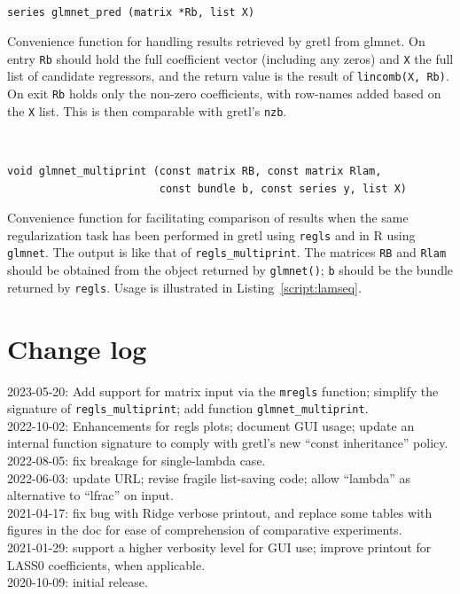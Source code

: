\documentclass{article}
\newenvironment{funcdoc}
{\noindent\hrulefill\\[-12pt]}
{\medbreak}
\begin{document}
\begin{funcdoc}
\begin{verbatim}
series glmnet_pred (matrix *Rb, list X)
\end{verbatim}
  Convenience function for handling results retrieved by gretl from
  \textsf{glmnet}. On entry \texttt{Rb} should hold the full
  coefficient vector (including any zeros) and \texttt{X} the full
  list of candidate regressors, and the return value is the result of
  \texttt{lincomb(X, Rb)}. On exit \texttt{Rb} holds only the non-zero
  coefficients, with row-names added based on the \texttt{X}
  list. This is then comparable with gretl's \texttt{nzb}.
\end{funcdoc}

\begin{funcdoc}
\begin{verbatim}
void glmnet_multiprint (const matrix RB, const matrix Rlam,
                        const bundle b, const series y, list X)
\end{verbatim}
  Convenience function for facilitating comparison of results when the
  same regularization task has been performed in gretl using
  \texttt{regls} and in \textsf{R} using \texttt{glmnet}. The output
  is like that of \texttt{regls\_multiprint}.  The matrices
  \texttt{RB} and \texttt{Rlam} should be obtained from the object
  returned by \texttt{glmnet()}; \texttt{b} should be the bundle
  returned by \texttt{regls}.  Usage is illustrated in
  Listing~\ref{script:lamseq}.
\end{funcdoc}

\section{Change log}
\label{sec:changes}

2023-05-20: Add support for matrix input via the \texttt{mregls}
function; simplify the signature of \texttt{regls\_multiprint};
add function \texttt{glmnet\_multiprint}.\\
2022-10-02: Enhancements for regls plots; document GUI usage;
update an internal function signature to comply with gretl's
new ``const inheritance'' policy.\\
2022-08-05: fix breakage for single-lambda case.\\
2022-06-03: update URL; revise fragile list-saving code;
allow ``lambda'' as alternative to ``lfrac'' on input.\\
2021-04-17: fix bug with Ridge verbose printout, and replace
some tables with figures in the doc for ease of comprehension
of comparative experiments.\\
2021-01-29: support a higher verbosity level for GUI use;
improve printout for LASS0 coefficients, when applicable.\\
2020-10-09: initial release.
\end{document}
